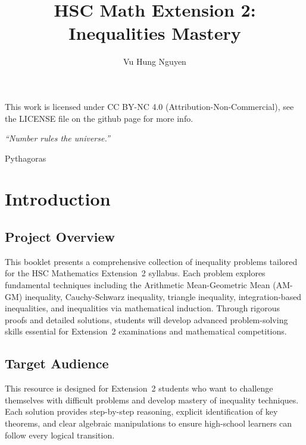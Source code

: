\documentclass[12pt]{article}
\author{Vu Hung Nguyen}
\title{HSC Math Extension 2: Inequalities Mastery}
\date{}
\begin{document}


\newpage


\begingroup\small\noindent This work is licensed under CC BY-NC 4.0 (Attribution-Non-Commercial), see the LICENSE file on the github page for more info.\par\endgroup

\newpage
\thispagestyle{empty}
\vspace*{\fill}
\begin{center}
\itshape
``Number rules the universe.''

\vspace{1em}
\normalfont Pythagoras
\end{center}
\vspace*{\fill}

\newpage
\tableofcontents
\newpage

\section{Introduction}

\subsection{Project Overview}
This booklet presents a comprehensive collection of inequality problems tailored for the HSC Mathematics Extension~2 syllabus. Each problem explores fundamental techniques including the Arithmetic Mean-Geometric Mean (AM-GM) inequality, Cauchy-Schwarz inequality, triangle inequality, integration-based inequalities, and inequalities via mathematical induction. Through rigorous proofs and detailed solutions, students will develop advanced problem-solving skills essential for Extension~2 examinations and mathematical competitions.

\subsection{Target Audience}
This resource is designed for Extension~2 students who want to challenge themselves with difficult problems and develop mastery of inequality techniques. Each solution provides step-by-step reasoning, explicit identification of key theorems, and clear algebraic manipulations to ensure high-school learners can follow every logical transition.
\end{document}
